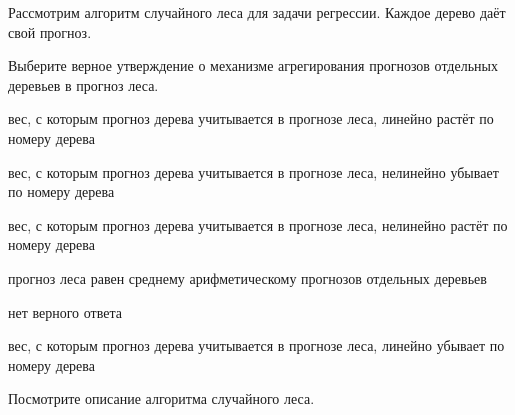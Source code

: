 
\begin{question}
Рассмотрим алгоритм случайного леса для задачи регрессии.
Каждое дерево даёт свой прогноз.

Выберите верное утверждение о механизме агрегирования прогнозов отдельных деревьев в прогноз леса.
\begin{answerlist}
  \item вес, с которым прогноз дерева учитывается в прогнозе леса, линейно растёт по номеру дерева
  \item вес, с которым прогноз дерева учитывается в прогнозе леса, нелинейно убывает по номеру дерева
  \item вес, с которым прогноз дерева учитывается в прогнозе леса, нелинейно растёт по номеру дерева
  \item прогноз леса равен среднему арифметическому прогнозов отдельных деревьев
  \item нет верного ответа
  \item вес, с которым прогноз дерева учитывается в прогнозе леса, линейно убывает по номеру дерева
\end{answerlist}
\end{question}

\begin{solution}
Посмотрите описание алгоритма случайного леса.
\end{solution}

